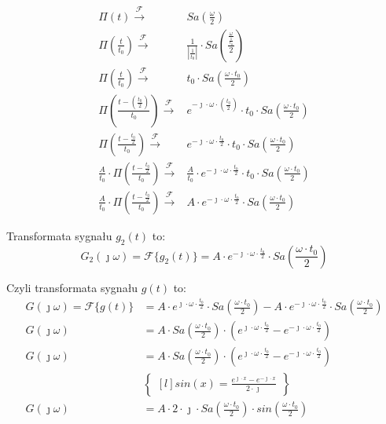 \begin{task}
\begin{align*}
\Pi(t) \xrightarrow{\mathcal F} & Sa\left(\frac{\omega}{2}\right)\\
\Pi(\frac{t}{t_{0}}) \xrightarrow{\mathcal F} & \frac{1}{\left|\frac{1}{t_{0}}\right|} \cdot Sa\left(\frac{ \frac{\omega}{ \frac{1}{t_{0}} }}{2}\right)\\
\Pi(\frac{t}{t_{0}}) \xrightarrow{\mathcal F} & t_{0} \cdot Sa\left(\frac{\omega \cdot t_{0}}{2}\right)\\
\Pi(\frac{t-(\frac{t_{0}}{2})}{t_{0}}) \xrightarrow{\mathcal F} & e^{-\jmath \cdot \omega \cdot (\frac{t_{0}}{2})} \cdot t_{0} \cdot Sa\left(\frac{\omega \cdot t_{0}}{2}\right)\\
\Pi(\frac{t-\frac{t_{0}}{2}}{t_{0}}) \xrightarrow{\mathcal F} & e^{-\jmath \cdot \omega \cdot \frac{t_{0}}{2}} \cdot t_{0} \cdot Sa\left(\frac{\omega \cdot t_{0}}{2}\right)\\
\frac{A}{t_{0}} \cdot \Pi(\frac{t-\frac{t_{0}}{2}}{t_{0}}) \xrightarrow{\mathcal F} & \frac{A}{t_{0}} \cdot e^{-\jmath \cdot \omega \cdot \frac{t_{0}}{2}} \cdot t_{0} \cdot Sa\left(\frac{\omega \cdot t_{0}}{2}\right)\\
\frac{A}{t_{0}} \cdot \Pi(\frac{t-\frac{t_{0}}{2}}{t_{0}}) \xrightarrow{\mathcal F} & A \cdot e^{-\jmath \cdot \omega \cdot \frac{t_{0}}{2}} \cdot Sa\left(\frac{\omega \cdot t_{0}}{2}\right)
\end{align*}

Transformata sygnału $g_{2}(t)$ to:
\begin{equation}
G_{2}(\jmath \omega) = \mathcal F\{g_{2}(t)\} = A \cdot e^{-\jmath \cdot \omega \cdot \frac{t_{0}}{2}} \cdot Sa\left(\frac{\omega \cdot t_{0}}{2}\right)
\end{equation}

Czyli transformata sygnału $g(t)$ to:
\begin{align*}
G(\jmath \omega) = \mathcal F\{g(t)\} &= A \cdot e^{\jmath \cdot \omega \cdot \frac{t_{0}}{2}} \cdot Sa\left(\frac{\omega \cdot t_{0}}{2}\right) - A \cdot  e^{-\jmath \cdot \omega \cdot \frac{t_{0}}{2}} \cdot Sa\left(\frac{\omega \cdot t_{0}}{2}\right)\\
G(\jmath \omega) &= A \cdot Sa\left(\frac{\omega \cdot t_{0}}{2}\right) \cdot \left(e^{\jmath \cdot \omega \cdot \frac{t_{0}}{2}} - e^{-\jmath \cdot \omega \cdot \frac{t_{0}}{2}}\right)\\
G(\jmath \omega) &= A \cdot Sa\left(\frac{\omega \cdot t_{0}}{2}\right) \cdot \left(e^{\jmath \cdot \omega \cdot \frac{t_{0}}{2}} - e^{-\jmath \cdot \omega \cdot \frac{t_{0}}{2}}\right)\\
&\begin{Bmatrix*}[l]
sin(x)=\frac{e^{\jmath \cdot x} - e^{-\jmath \cdot x}}{2 \cdot \jmath}
\end{Bmatrix*}\\
G(\jmath \omega) &= A \cdot 2 \cdot \jmath \cdot Sa\left(\frac{\omega \cdot t_{0}}{2}\right) \cdot sin\left(\frac{\omega \cdot t_{0}}{2}\right)\\
\end{align*}


\end{task}
